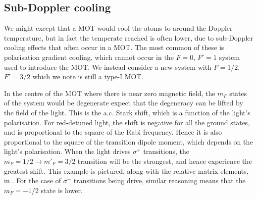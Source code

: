\subsection{Sub-Doppler cooling}

We might except that a MOT would cool the atoms to around the Doppler
temperature, but in fact the temperate reached is often lower, due to
sub-Doppler cooling effects that often occur in a MOT. The most common of these
is polarisation gradient cooling, which cannot occur in the $F=0$, $F'=1$
system used to introduce the MOT. We instead consider a new system with
$F=1/2$, $F'=3/2$ which we note is still a type-I MOT.

In the centre of the MOT where there is near zero magnetic field, the $m_F$
states of the system would be degenerate expect that the degeneracy can be
lifted by the field of the light. This is the a.c. Stark shift, which is a
function of the light's polarisation.
%
For red-detuned light, the shift is negative for all the ground states, and is
proportional to the square of the Rabi frequency. Hence it is also proportional
to the square of the transition dipole moment, which depends on the light's
polarisation.
%
When the light drives $\sigma^+$ transitions, the $m_F=1/2 \rightarrow
m'_F=3/2$ transition will be the strongest, and hence experience the greatest
shift. This example is pictured, along with the relative matrix elements, in 
. For the case of $\sigma^-$ transitions
being drive, similar reasoning means that the $m_F=-1/2$ state is lower.

